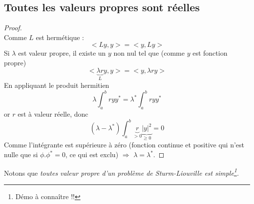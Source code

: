 \documentclass[british,french,11pt, a4paper, openany]{book}
\begin{document}
		\subsection{Toutes les valeurs propres sont réelles}
		\begin{proof}
			\ \\
			Comme $L$ est hermétique :
			\begin{equation}
				<Ly,y> = <y,Ly>
			\end{equation}
			Si $\lambda$ est valeur propre, il existe un $y$ non nul tel que (comme $y$ est fonction propre)
			\begin{equation}
				<\underbrace{\lambda r}_{L}y, y> = <y, \lambda r y>
			\end{equation}
			En appliquant le produit hermitien
			\begin{equation}
				\lambda \int_a^b r yy^* = \lambda^* \int_a^b r yy^*
			\end{equation}
			or $r$ est à valeur réelle, donc
			\begin{equation}
				(\lambda-\lambda^*) \int_a^b \underbrace{r}_{>0} \underbrace{|y|^2}_{\geq 0} = 0
			\end{equation}
			Comme l'intégrante est supérieure à zéro (fonction continue et positive qui n'est nulle que si $\phi.\phi^* = 0$, ce qui est exclu) $\Rightarrow$ $\lambda = \lambda^*$.
		\end{proof}
													
		Notons que \textit{toutes valeur propre d'un problème de Sturm-Liouville est simple\footnote{Démo à connaître !!}.}
													
		\setcounter{subsection}{5}
\end{document}
